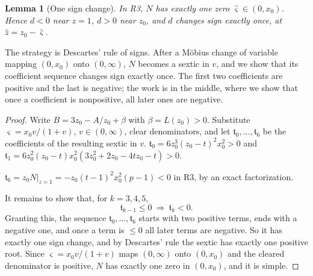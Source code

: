 \documentclass[11pt]{amsart}
\newtheorem{lemma}[theorem]{Lemma}
\theoremstyle{definition}
\theoremstyle{remark}
\numberwithin{equation}{section}
\begin{document}
\begin{lemma}[One sign change]\label{lem:P1}
In R3, $N$ has exactly one zero $\hat \varsigma\in(0,x_0)$. Hence $d<0$ near $z=1$, $d>0$ near $z_0$, and $d$ changes sign
exactly once, at $\hat z=z_0-\hat \varsigma$.
\end{lemma}

The strategy is Descartes' rule of signs. After a M\"obius change of variable mapping $(0,x_0)$ onto $(0,\infty)$,
$N$ becomes a sextic in $v$, and we show that its coefficient sequence changes sign exactly once. The first two
coefficients are positive and the last is negative; the work is in the middle, where we show that once a
coefficient is nonpositive, all later ones are negative.

\begin{proof}
Write $B=3z_0-A/z_0+\beta$ with $\beta=L(z_0)>0$. Substitute $\varsigma=x_0v/(1+v)$, $v\in(0,\infty)$, clear denominators, and
let $\mathfrak t_0,\dots,\mathfrak t_6$ be the coefficients of the resulting sextic in $v$.
$\mathfrak t_0=6z_0^3(z_0-t)^2x_0^2>0$ and $\mathfrak t_1=6z_0^2(z_0-t)x_0^2(3z_0^2+2z_0-4tz_0-t)>0$.

$\mathfrak t_6=z_0N|_{z=1}=-z_0(t-1)^2x_0^2(p-1)<0$ in R3, by an exact factorization.

It remains to show that, for $k=3,4,5$,
\begin{equation}\label{eq:implication}
\mathfrak t_{k-1}\le0\ \Longrightarrow\ \mathfrak t_k<0 .
\end{equation}
Granting this, the sequence $\mathfrak t_0,\dots,\mathfrak t_6$ starts with two positive terms, ends with a negative one,
and once a term is $\le0$ all later terms are negative. So it has exactly one sign change, and by Descartes' rule the
sextic has exactly one positive root. Since $\varsigma=x_0v/(1+v)$ maps $(0,\infty)$ onto $(0,x_0)$ and the cleared
denominator is positive, $N$ has exactly one zero in $(0,x_0)$, and it is simple.


\end{proof}
\end{document}
